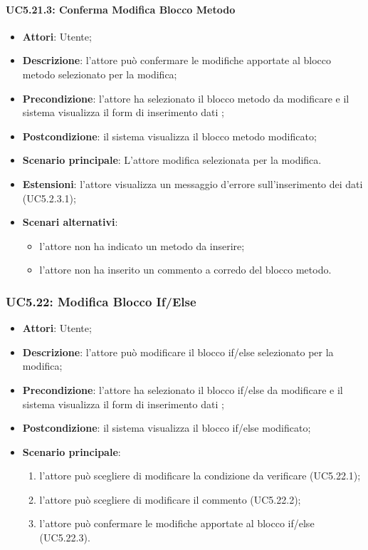 \begin{itemize}
\begin{itemize}
\begin{itemize}
\begin{itemize}
\paragraph{UC5.21.3: Conferma Modifica Blocco Metodo}
\label{UC5.21.3}
\begin{itemize}
	\item \textbf{Attori}: Utente;
	\item \textbf{Descrizione}: l'attore può confermare le modifiche apportate al blocco metodo selezionato per la modifica;
	\item \textbf{Precondizione}: l'attore ha selezionato il blocco metodo da modificare e il sistema visualizza il form di inserimento dati ;
	\item \textbf{Postcondizione}: il sistema visualizza il blocco metodo modificato;
	\item \textbf{Scenario principale}: L'attore modifica  selezionata per la modifica.
	\item \textbf{Estensioni}: l'attore visualizza un messaggio d'errore sull'inserimento dei dati (UC5.2.3.1);
	\item \textbf{Scenari alternativi}:
	\begin{itemize}
		\item l'attore non ha indicato un metodo da inserire;
		\item l'attore non ha inserito un commento a corredo del blocco metodo.
	\end{itemize}
\end{itemize}

\subsubsection{UC5.22: Modifica Blocco If/Else}
\label{UC5.22}
\begin{itemize}
	\item \textbf{Attori}: Utente;
	\item \textbf{Descrizione}: l'attore può modificare il blocco if/else selezionato per la modifica;
	\item \textbf{Precondizione}: l'attore ha selezionato il blocco if/else da modificare e il sistema visualizza il form di inserimento dati ;
	\item \textbf{Postcondizione}: il sistema visualizza il blocco if/else modificato;
	\item \textbf{Scenario principale}:
	\begin{enumerate}
		\item l'attore può scegliere di modificare la condizione da verificare (UC5.22.1);
		\item l'attore può scegliere di modificare il commento (UC5.22.2);
		\item l'attore può confermare le modifiche apportate al blocco if/else (UC5.22.3).
	\end{enumerate}
\end{itemize}


\end{itemize}
\end{itemize}
\end{itemize}
\end{itemize}
